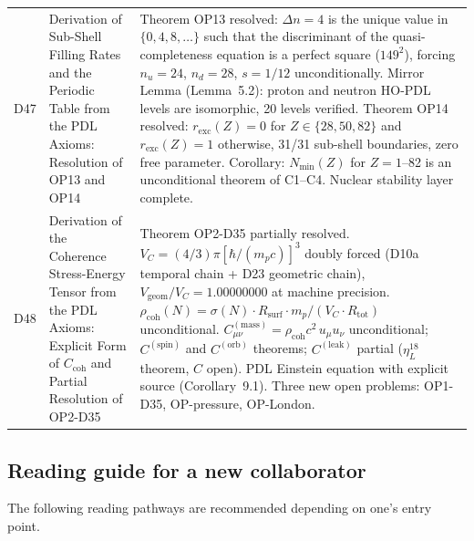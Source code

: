 \documentclass[11pt,a4paper]{article}
\theoremstyle{plain}
\theoremstyle{definition}
\theoremstyle{remark}
\newcommand{\Rsurf}{R_{\mathrm{surf}}}
\newcommand{\Rtot}{R_{\mathrm{tot}}}
\newcommand{\rhocoh}{\rho_{\mathrm{coh}}}
\newcommand{\Ccoh}{C_{\mathrm{coh}}}
\begin{document}
\begin{longtable}{L{1.3cm}L{3.8cm}L{8.0cm}}
D47 & Derivation of Sub-Shell Filling Rates and the Periodic Table from the PDL Axioms: Resolution of OP13 and OP14~\cite{D47} & \textcolor{proofblue}{Theorem} OP13 resolved: $\Delta n=4$ is the unique value in $\{0,4,8,\ldots\}$ such that the discriminant of the quasi-completeness equation is a perfect square ($149^2$), forcing $n_u=24$, $n_d=28$, $s=1/12$ unconditionally. Mirror Lemma (Lemma~5.2): proton and neutron HO-PDL levels are isomorphic, 20 levels verified. \textcolor{proofblue}{Theorem} OP14 resolved: $r_{\mathrm{exc}}(Z)=0$ for $Z\in\{28,50,82\}$ and $r_{\mathrm{exc}}(Z)=1$ otherwise, 31/31 sub-shell boundaries, zero free parameter. Corollary: $N_{\min}(Z)$ for $Z=1$--82 is an unconditional theorem of C1--C4. Nuclear stability layer complete.\\[0.4em]
D48 & Derivation of the Coherence Stress-Energy Tensor from the PDL Axioms: Explicit Form of $\Ccoh$ and Partial Resolution of OP2-D35~\cite{D48} & \textcolor{proofblue}{Theorem} OP2-D35 partially resolved. $V_C=(4/3)\pi[\hbar/(m_p c)]^3$ doubly forced (D10a temporal chain + D23 geometric chain), $V_{\mathrm{geom}}/V_C=1.00000000$ at machine precision. $\rhocoh(N)=\sigma(N)\cdot\Rsurf\cdot m_p/(V_C\cdot\Rtot)$ unconditional. $C^{(\mathrm{mass})}_{\mu\nu}=\rhocoh c^2\,u_\mu u_\nu$ unconditional; $C^{(\mathrm{spin})}$ and $C^{(\mathrm{orb})}$ theorems; $C^{(\mathrm{leak})}$ partial ($\eta_L^{18}$ theorem, $C$ open). PDL Einstein equation with explicit source (Corollary~9.1). Three new open problems: OP1-D35, OP-pressure, OP-London.\\[0.4em]
\end{longtable}

\subsection{Reading guide for a new collaborator}
\label{subsec:readingguide}
The following reading pathways are recommended depending on one's entry point.
\end{document}
